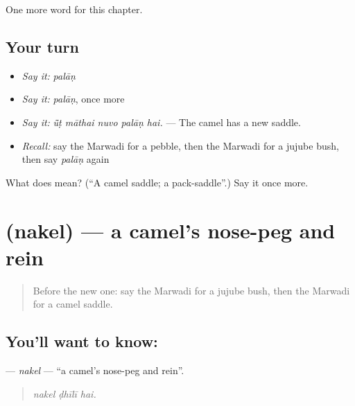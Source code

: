 \begin{grammarlens}[title={What you've built}]
One more word for this chapter.
\end{grammarlens}

\subsection*{Your turn}
\begin{itemize}
\raggedright
  \item \emph{Say it:} \emph{palāṇ}
  \item \emph{Say it:} \emph{palāṇ}, once more
  \item \emph{Say it:} \emph{ū̃ṭ māthai nuvo palāṇ hai.} — The camel has a new saddle.
  \item \emph{Recall:} say the Marwadi for a pebble, then the Marwadi for a jujube bush, then say \emph{palāṇ} again
\end{itemize}

\begin{tcolorbox}[breakable,colback=teal!4,colframe=teal!35!black,title={Before you move on}]
What does  mean? (\textquotedblleft{}A camel saddle; a pack-saddle\textquotedblright{}.) Say it once more.
\end{tcolorbox}
\section[\texorpdfstring{\mw{नकेल} (nakel)}{नकेल (nakel)}]{ (nakel) — a camel's nose-peg and rein}

\label{lesson:MW-C233-nakel}



\begin{quote}
Before the new one: say the Marwadi for a jujube bush, then the Marwadi for a camel saddle.
\end{quote}

\subsection*{You'll want to know: }
\textbf{} — \emph{nakel} — \textquotedblleft{}a camel's nose-peg and rein\textquotedblright{}.

\begin{quote}
  
\end{quote}

\begin{quote}
\emph{nakel ḍhīlī hai.}
\end{quote}

